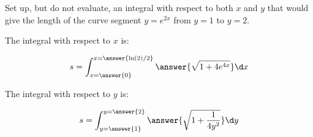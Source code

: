 \documentclass{ximera}
\author{Jim Talamo}
\begin{document}
\begin{exercise}

Set up, but do not evaluate, an integral with respect to both $x$ and $y$ that would give the length of the curve segment $y=e^{2x}$ from $y=1$ to $y=2$.

The integral with respect to $x$ is:

\[
s= \int_{x=\answer{0}}^{x=\answer{\ln(2)/2}} \answer{\sqrt{1+4e^{4x}}} \d x
\]

The integral with respect to $y$ is:

\[
s= \int_{y=\answer{1}}^{y=\answer{2}} \answer{\sqrt{1+\frac{1}{4y^2}}} \d y
\]

\end{exercise}
\end{document}
